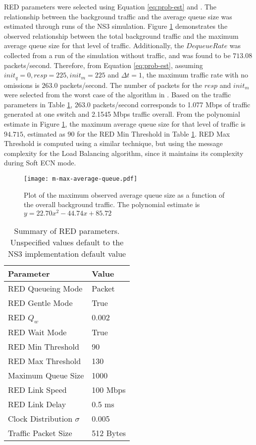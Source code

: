 \ac{RED} parameters were selected using Equation \ref{eq:prob-est} and \cite{JOURNAL}.
The relationship between the background traffic and the average queue size was estimated through runs of the \ac{NS3} simulation.
Figure \ref{fig:plotm} demonstrates the observed relationship between the total background traffic and the maximum average queue size for that level of traffic.
Additionally, the $DequeueRate$ was collected from a run of the simulation without traffic, and was found to be $713.08$ packets/second.
Therefore, from Equation \ref{eq:prob-est}, assuming $init_q=0, resp=225, init_m=225$ and $\Delta t=1$, the maximum traffic rate with no omissions is $263.0$ packets/second.
The number of packets for the $resp$ and $init_m$ were selected from the worst case of the algorithm in \cite{JOURNAL}.
Based on the traffic parameters in Table \ref{tab:red-parameters}, $263.0$ packets/second corresponds to 1.077 Mbps of traffic generated at one switch and 2.1545 Mbps traffic overall.
From the polynomial estimate in Figure \ref{fig:plotm}, the maximum average queue size for that level of traffic is $94.715$, estimated as $90$ for the \ac{RED} Min Threshold in Table \ref{tab:red-parameters}.
RED Max Threshold is computed using a similar technique, but using the message complexity for the Load Balancing algorithm, since it maintains its complexity during Soft ECN mode.

\begin{figure}
\centering
\texttt{[image: m-max-average-queue.pdf]}
\caption{Plot of the maximum observed average queue size as a function of the overall background traffic. The polynomial estimate is $y=22.70x^2-44.74x+85.72$}
\label{fig:plotm}
\end{figure}

\begin{table}
\begin{center}
\begin{tabular}{ | l | l | } \hline
Parameter & Value         \\ \hline
RED Queueing Mode & Packet\\ \hline 
RED Gentle Mode & True    \\ \hline
RED $Q_{w}$ & 0.002       \\ \hline
RED Wait Mode & True      \\ \hline
RED Min Threshold & 90    \\ \hline
RED Max Threshold & 130   \\ \hline
Maximum Queue Size & 1000 \\ \hline
RED Link Speed & 100 Mbps \\ \hline
RED Link Delay & 0.5 ms   \\ \hline
Clock Distribution $\sigma$ & 0.005 \\ \hline
Traffic Packet Size & 512 Bytes \\ \hline
\end{tabular}
\end{center}
\caption{Summary of \ac{RED} parameters. Unspecified values default to the \ac{NS3} implementation default value}
\label{tab:red-parameters}
\end{table}

